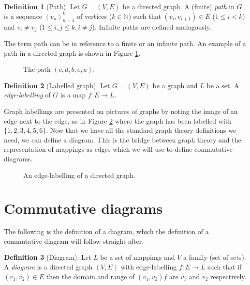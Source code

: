 \documentclass[12pt]{article}
\theoremstyle{definition}
\newtheorem{definition}{Definition}
\theoremstyle{remark}
\begin{document}
\begin{definition}[Path]
  \label{def:path}
  Let $G=(V,E)$ be a directed graph. A (finite) \textit{path} in $G$ is a sequence $(v_n)_{n=1}^k$ of vertices ($k\in\mathbb{N}$) such that $(v_i,v_{i+1})\in E$ ($1\leq i<k$) and $v_i \neq v_j$ ($1\leq i,j \leq k, i\neq j$). Infinite paths are defined analagously.
\end{definition}

The term path can be in reference to a finite or an infinite path. An example of a path in a directed graph is shown in Figure \ref{fig:dir-graph-path}.

\begin{figure}[h]
  \centering
  \caption{The path $(c,d,b,e,a)$.}
  \label{fig:dir-graph-path}
\end{figure}

\begin{definition}[Labelled graph]
  \label{def:lab-graph}
  Let $G=(V,E)$ be a graph and $L$ be a set. A \textit{edge-labelling} of $G$ is a map $f:E\to L$.
\end{definition}

Graph labellings are presented on pictures of graphs by noting the image of an edge next to the edge, as in Figure \ref{fig:graph-label} where the graph has been labelled with $\{1,2,3,4,5,6\}$. Now that we have all the standard graph theory definitions we need, we can define a diagram. This is the bridge between graph theory and the representation of mappings as edges which we will use to define commutative diagrams.

\begin{figure}[h]
  \centering
  \caption{An edge-labelling of a directed graph.}
  \label{fig:graph-label}
\end{figure}

\section{Commutative diagrams}
\label{sec:com-diag}

The following is the definition of a diagram, which the definition of a commutative diagram will follow straight after.

\begin{definition}[Diagram]
  \label{def:diag}
  Let $L$ be a set of mappings and $V$ a family (set of sets). A \textit{diagram} is a directed graph $(V,E)$ with edge-labelling $f:E\to L$ such that if $(v_1,v_2)\in E$ then the domain and range of $(v_1,v_2)f$ are $v_1$ and $v_2$ respectively.
\end{definition}
\end{document}
